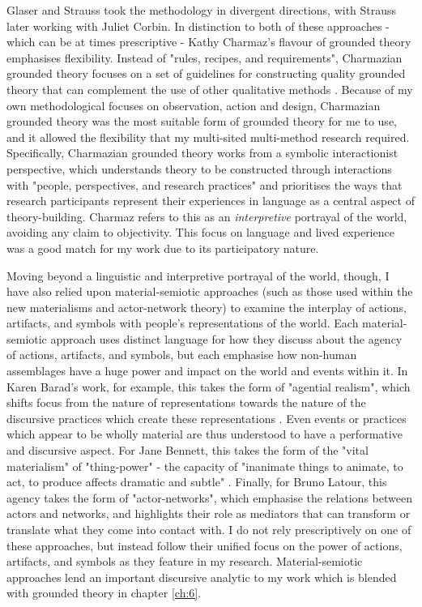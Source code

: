 Glaser and Strauss took the methodology in divergent directions, with Strauss later working with Juliet Corbin. In distinction to both of these approaches - which can be at times prescriptive - Kathy Charmaz's flavour of grounded theory emphasises flexibility. Instead of "rules, recipes, and requirements", Charmazian grounded theory focuses on a set of guidelines for constructing quality grounded theory that can complement the use of other qualitative methods  \cite[10]{charmaz_constructing_2006}. Because of my own methodological focuses on observation, action and design, Charmazian grounded theory was the most suitable form of grounded theory for me to use, and it allowed the flexibility that my multi-sited multi-method research required. Specifically, Charmazian grounded theory works from a symbolic interactionist perspective, which understands theory to be constructed through interactions with "people, perspectives, and research practices" and prioritises the ways that research participants represent their experiences in language as a central aspect of theory-building. Charmaz refers to this as an \textit{interpretive} portrayal of the world, avoiding any claim to objectivity. This focus on language and lived experience was a good match for my work due to its participatory nature. 

Moving beyond a linguistic and interpretive portrayal of the world, though, I have also relied upon material-semiotic approaches (such as those used within the new materialisms and actor-network theory) to examine the interplay of actions, artifacts, and symbols with people's representations of the world. Each material-semiotic approach uses distinct language for how they discuss about the agency of actions, artifacts, and symbols, but each emphasise how non-human assemblages have a huge power and impact on the world and events within it. In Karen Barad's work, for example, this takes the form of "agential realism", which shifts focus from the nature of representations towards the nature of the discursive practices which create these representations \citep[45]{barad_meeting_2007}. Even events or practices which appear to be wholly material are thus understood to have a performative and discursive aspect. For Jane Bennett, this takes the form of the "vital materialism" of "thing-power" - the capacity of "inanimate things to animate, to act, to produce affects dramatic and subtle" \citep[6]{bennett_vibrant_2010}. Finally,  for Bruno Latour, this agency takes the form of "actor-networks", which emphasise the relations between actors and networks, and highlights their role as mediators that can transform or translate what they come into contact with. I do not rely prescriptively on one of these approaches, but instead follow their unified focus on the power of actions, artifacts, and symbols as they feature in my research. Material-semiotic approaches lend an important discursive analytic to my work which is blended with grounded theory in chapter \ref{ch:6}. 

